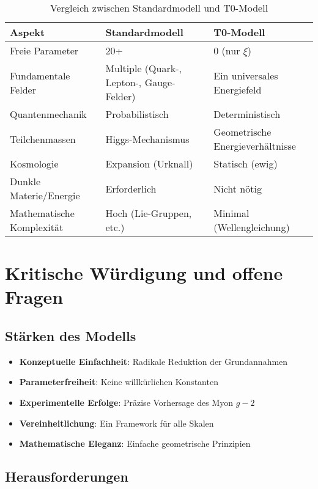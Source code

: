 \documentclass[12pt,a4paper]{article}
\newcommand{\xipar}{\ensuremath{\xi}}
\begin{document}
	\begin{table}[H]
		\centering
		\begin{tabular}{p{5cm}p{5cm}p{5cm}}
			\toprule
			\textbf{Aspekt} & \textbf{Standardmodell} & \textbf{T0-Modell} \\
			\midrule
			Freie Parameter & 20+ & 0 (nur $\xipar$) \\
			Fundamentale Felder & Multiple (Quark-, Lepton-, Gauge-Felder) & Ein universales Energiefeld \\
			Quantenmechanik & Probabilistisch & Deterministisch \\
			Teilchenmassen & Higgs-Mechanismus & Geometrische Energieverhältnisse \\
			Kosmologie & Expansion (Urknall) & Statisch (ewig) \\
			Dunkle Materie/Energie & Erforderlich & Nicht nötig \\
			Mathematische Komplexität & Hoch (Lie-Gruppen, etc.) & Minimal (Wellengleichung) \\
			\bottomrule
		\end{tabular}
		\caption{Vergleich zwischen Standardmodell und T0-Modell}
	\end{table}
	
	\section{Kritische Würdigung und offene Fragen}
	
	\subsection{Stärken des Modells}
	
	\begin{itemize}
		\item \textbf{Konzeptuelle Einfachheit}: Radikale Reduktion der Grundannahmen
		\item \textbf{Parameterfreiheit}: Keine willkürlichen Konstanten
		\item \textbf{Experimentelle Erfolge}: Präzise Vorhersage des Myon $g-2$
		\item \textbf{Vereinheitlichung}: Ein Framework für alle Skalen
		\item \textbf{Mathematische Eleganz}: Einfache geometrische Prinzipien
	\end{itemize}
	
	\subsection{Herausforderungen}
	
\end{document}
